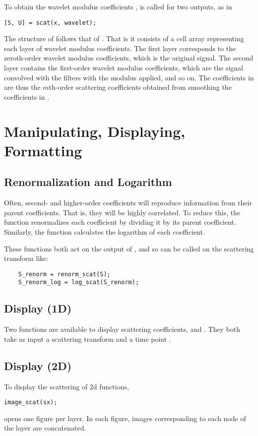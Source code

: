 \documentclass[twocolumn]{article}
\begin{document}
To obtain the wavelet modulus coefficients ,  is called for two outputs, as in
\begin{lstlisting}
[S, U] = scat(x, wavelet);
\end{lstlisting}
The structure of  follows that of . That is it consists of a cell array representing each layer of wavelet modulus coefficients. The first layer 
corresponds to the zeroth-order wavelet modulus coefficients, which is the original signal. The second layer contains the first-order wavelet modulus coefficients, 
which are the signal convolved with the filters with the modulus applied, and so on. The coefficients in  are thus the $m$th-order scattering 
coefficients obtained from smoothing the coefficients in .

\section{Manipulating, Displaying, Formatting}

\subsection{Renormalization and Logarithm}
Often, second- and higher-order coefficients will reproduce information from their parent coefficients. That is, they will be highly correlated. To reduce this, 
the  function renormalizes each coefficient by dividing it by its parent coefficient. Similarly, the  function calculates 
the logarithm of each coefficient.

These functions both act on the output of , and so can be called on the scattering transform  like:
\begin{lstlisting}
	S_renorm = renorm_scat(S);
	S_renorm_log = log_scat(S_renorm);
\end{lstlisting}

\subsection{Display (1D)}
Two functions are available to display scattering coefficients,  and . They both take as input a scattering transform  and a time point .

\subsection{Display (2D)}
To display the scattering of 2d functions, 
\begin{lstlisting}
image_scat(sx);
\end{lstlisting}
opens one figure per layer. In each figure, images corresponding to each node of the layer are concatenated.
\end{document}

